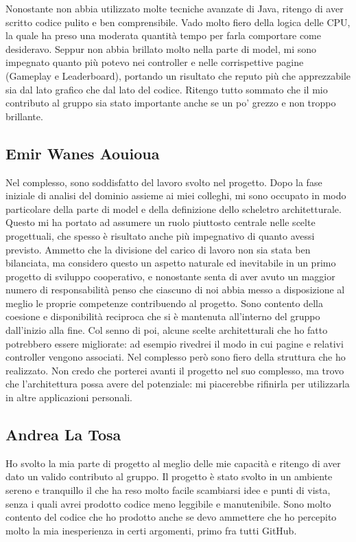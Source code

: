 \documentclass[a4paper,12pt]{report}
\begin{document}
Nonostante non abbia utilizzato molte tecniche avanzate di Java, ritengo di aver scritto codice pulito e ben comprensibile.
Vado molto fiero della logica delle CPU, la quale ha preso una moderata quantità tempo per farla comportare come desideravo.
Seppur non abbia brillato molto nella parte di model, mi sono impegnato quanto più potevo nei controller e nelle corrispettive pagine (Gameplay e Leaderboard), portando un risultato che reputo più che apprezzabile sia dal lato grafico che dal lato del codice.
Ritengo tutto sommato che il mio contributo al gruppo sia stato importante anche se un po' grezzo e non troppo brillante.

\subsection{Emir Wanes Aouioua}
Nel complesso, sono soddisfatto del lavoro svolto nel progetto. Dopo la fase iniziale di analisi
del dominio assieme ai miei colleghi, mi sono occupato in modo particolare della parte di model
e della definizione dello scheletro architetturale. Questo mi ha portato ad assumere un ruolo
piuttosto centrale nelle scelte progettuali, che spesso è risultato anche più
impegnativo di quanto avessi previsto.
Ammetto che la divisione del carico di lavoro non sia stata ben bilanciata, ma considero
questo un aspetto naturale ed inevitabile in un primo progetto di sviluppo cooperativo, e nonostante
senta di aver avuto un maggior numero di responsabilità
penso che ciascuno di noi abbia messo a disposizione al meglio le proprie competenze
contribuendo al progetto. Sono contento della coesione e disponibilità reciproca che si è mantenuta
all'interno del gruppo dall'inizio alla fine.
Col senno di poi, alcune scelte architetturali che ho fatto potrebbero essere migliorate:
ad esempio rivedrei il modo in cui pagine e relativi controller vengono associati.
Nel complesso però sono fiero della struttura che ho realizzato.
Non credo che porterei avanti il progetto nel suo complesso, ma trovo che
l'architettura possa avere del potenziale: mi piacerebbe rifinirla per utilizzarla
in altre applicazioni personali.

\subsection{Andrea La Tosa}
Ho svolto la mia parte di progetto al meglio delle mie capacità e ritengo di aver dato un valido contributo al gruppo.
Il progetto è stato svolto in un ambiente sereno e tranquillo il che ha reso molto facile scambiarsi idee e punti di vista, senza i quali avrei prodotto codice meno leggibile e manutenibile.
Sono molto contento del codice che ho prodotto anche se devo ammettere che ho percepito molto la mia inesperienza in certi argomenti, primo fra tutti GitHub. 
\end{document}
